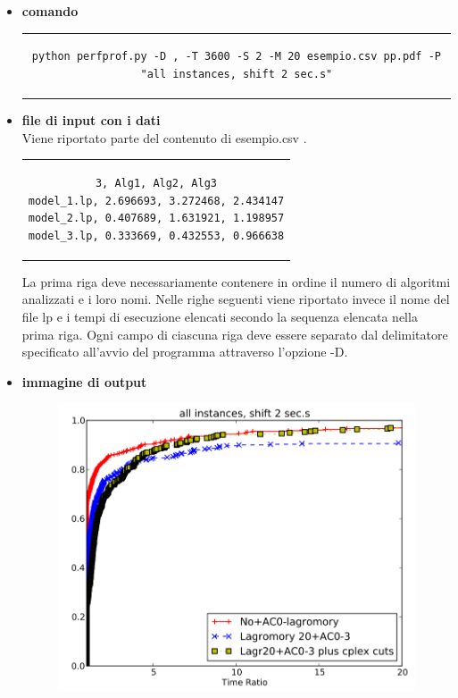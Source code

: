 \begin{itemize}
\item{\textbf{comando}
\begin{center}
\begin{tabular}{c}
\begin{lstlisting}[linewidth=320pt, basicstyle=\footnotesize\sffamily,] 
python perfprof.py -D , -T 3600 -S 2 -M 20 esempio.csv pp.pdf -P "all instances, shift 2 sec.s"
\end{lstlisting}
\end{tabular}
\end{center}
}
\item{\textbf{file di input con i dati}\\
Viene riportato parte del contenuto di esempio.csv .
\begin{center}
\begin{tabular}{c}
\begin{lstlisting}[linewidth=320pt, basicstyle=\footnotesize\sffamily,] 
3, Alg1, Alg2, Alg3
model_1.lp, 2.696693, 3.272468, 2.434147
model_2.lp, 0.407689, 1.631921, 1.198957
model_3.lp, 0.333669, 0.432553, 0.966638
\end{lstlisting}
\end{tabular}
\end{center}
La prima riga deve necessariamente contenere in ordine il numero di algoritmi analizzati e i loro nomi. Nelle righe seguenti viene riportato invece il nome del file lp e i tempi di esecuzione elencati secondo la sequenza elencata nella prima riga.
Ogni campo di ciascuna riga deve essere separato dal delimitatore specificato all'avvio del programma attraverso l'opzione -D.
}
\item{\textbf{immagine di output}
\begin{figure}[h] 
\begin{center} 
  \includegraphics[scale=0.5]{Images/profile_out}\\ 
\end{center} 
\end{figure}
}
\end{itemize}
